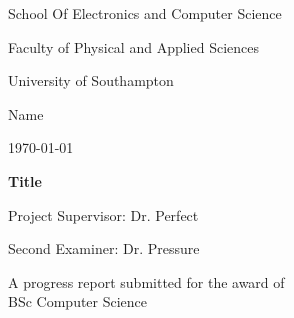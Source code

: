 \begin{titlepage}
    \let\footnotesize\small
    \let\footnoterule\relax
    \let \footnote \thanks
    \setcounter{footnote}{0}
    \begin{center}
      \setlength{\parskip}{0pt}
       {\large School Of Electronics and Computer Science \par}
      {\large Faculty of Physical and Applied Sciences \par}
      {\large University of Southampton \par}
      \vspace{29mm}
      {\large Name \par}	
	\vspace{4mm}
      \large \today
	\vspace{13mm}
        \center
        {\Large \bf Title \par}
        \vspace{60mm}
      {\large Project Supervisor: Dr. Perfect \par }
      {\large Second Examiner: Dr. Pressure \par}
      \vspace{12mm}
        {\large A progress report submitted for the award of }\\
      {\large BSc Computer Science }
    \end{center}
    \vfil\null
  \end{titlepage}